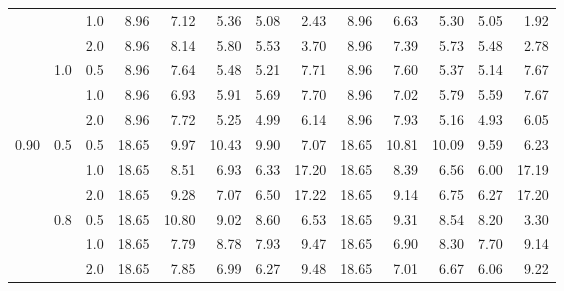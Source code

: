 \documentclass{article}
\begin{document}
{\begin{tabular}{lllrrrrrrrrrr}
          &     & 1.0 &    8.96 &        7.12 &                  5.36 &                     5.08 &           2.43 &    8.96 &        6.63 &                  5.30 &                     5.05 &           1.92 \\
          &     & 2.0 &    8.96 &        8.14 &                  5.80 &                     5.53 &           3.70 &    8.96 &        7.39 &                  5.73 &                     5.48 &           2.78 \\
          & 1.0 & 0.5 &    8.96 &        7.64 &                  5.48 &                     5.21 &           7.71 &    8.96 &        7.60 &                  5.37 &                     5.14 &           7.67 \\
          &     & 1.0 &    8.96 &        6.93 &                  5.91 &                     5.69 &           7.70 &    8.96 &        7.02 &                  5.79 &                     5.59 &           7.67 \\
          &     & 2.0 &    8.96 &        7.72 &                  5.25 &                     4.99 &           6.14 &    8.96 &        7.93 &                  5.16 &                     4.93 &           6.05 \\
     0.90 & 0.5 & 0.5 &   18.65 &        9.97 &                 10.43 &                     9.90 &           7.07 &   18.65 &       10.81 &                 10.09 &                     9.59 &           6.23 \\
          &     & 1.0 &   18.65 &        8.51 &                  6.93 &                     6.33 &          17.20 &   18.65 &        8.39 &                  6.56 &                     6.00 &          17.19 \\
          &     & 2.0 &   18.65 &        9.28 &                  7.07 &                     6.50 &          17.22 &   18.65 &        9.14 &                  6.75 &                     6.27 &          17.20 \\
          & 0.8 & 0.5 &   18.65 &       10.80 &                  9.02 &                     8.60 &           6.53 &   18.65 &        9.31 &                  8.54 &                     8.20 &           3.30 \\
          &     & 1.0 &   18.65 &        7.79 &                  8.78 &                     7.93 &           9.47 &   18.65 &        6.90 &                  8.30 &                     7.70 &           9.14 \\
          &     & 2.0 &   18.65 &        7.85 &                  6.99 &                     6.27 &           9.48 &   18.65 &        7.01 &                  6.67 &                     6.06 &           9.22 \\

\end{tabular}}
\end{document}
